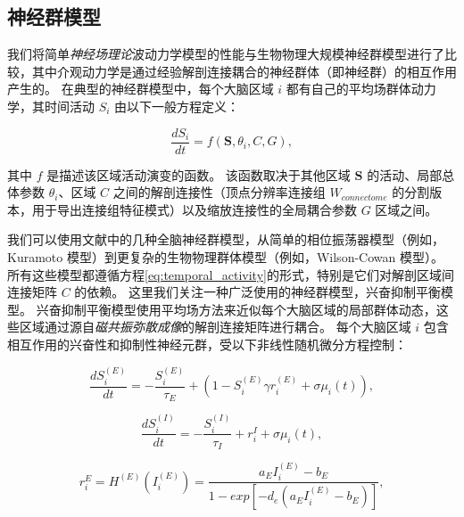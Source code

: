 \documentclass[lang=cn,a4paper,newtx,citestyle=gb7714-2015, bibstyle=gb7714-2015]{elegantpaper}
\begin{document}
\subsection{神经群模型} \label{sec:neural_mass}

我们将简单\textit{神经场理论}波动力学模型的性能与生物物理大规模神经群模型进行了比较，其中介观动力学是通过经验解剖连接耦合的神经群体（即神经群）的相互作用产生的。
在典型的神经群模型中，每个大脑区域 $ i $ 都有自己的平均场群体动力学，其时间活动 $ S_i $ 由以下一般方程定义：

\begin{equation}\label{eq:temporal_activity}
	\frac{dS_i}{dt} = f(\boldsymbol{S}, \theta_i, C, G), 
\end{equation}

其中 $ f $ 是描述该区域活动演变的函数。
该函数取决于其他区域 $ \boldsymbol{S} $ 的活动、局部总体参数 $ \theta_i $、区域 $ C $ 之间的解剖连接性（顶点分辨率连接组 $ W_{connectome} $ 的分割版本，用于导出连接组特征模式）以及缩放连接性的全局耦合参数 $ G $ 区域之间。


我们可以使用文献中的几种全脑神经群模型\cite{sanz2013virtual}，从简单的相位振荡器模型（例如，Kuramoto 模型\cite{breakspear2010generative}）到更复杂的生物物理群体模型（例如，Wilson-Cowan 模型\cite{wilson1972excitatory}）。
所有这些模型都遵循方程\ref{eq:temporal_activity}的形式，特别是它们对解剖区域间连接矩阵 $ C $ 的依赖。
这里我们关注一种广泛使用的神经群模型，兴奋抑制平衡模型\cite{deco2014local,deco2021dynamical,demirtacs2019hierarchical,aquino2022intersection}。
兴奋抑制平衡模型使用平均场方法来近似每个大脑区域的局部群体动态，这些区域通过源自\textit{磁共振弥散成像}的解剖连接矩阵进行耦合。
每个大脑区域 $ i $ 包含相互作用的兴奋性和抑制性神经元群，受以下非线性随机微分方程控制：

\begin{equation}\label{eq:synaptic_gating_E}
	\frac{dS_i^{(E)}}{dt} = - \frac{S_i^{(E)}}{\tau_E} + (1-S_i^{(E)} \gamma r_i^(E) + \sigma \mu_i(t)),
\end{equation}

\begin{equation}\label{eq:synaptic_gating_I}
	\frac{dS_i^{(I)}}{dt} = - \frac{S_i^{(I)}}{\tau_I} + r_i^{I} + \sigma \mu_i(t),
\end{equation}

\begin{equation}\label{eq:firing_rate_E}
	r_i^{E} = H^{(E)} (I_i^{(E)}) = \frac{a_E I_i^{(E)} - b_E}{1 - exp[-d_e (a_E I_i^{(E)} - b_E)]},
\end{equation}
\end{document}
